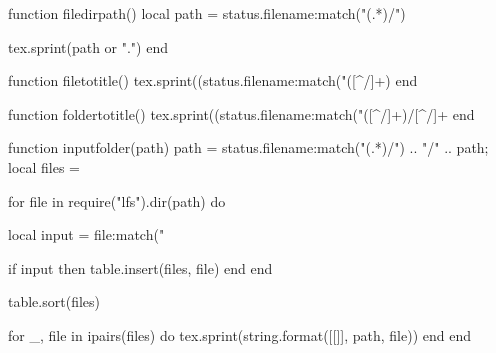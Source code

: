 \begin{luacode*}
    function filedirpath()
        local path = status.filename:match("(.*)/")

        tex.sprint(path or ".")
    end
\end{luacode*}

\begin{luacode*}
    function filetotitle()
        tex.sprint((status.filename:match("([^/]+)%
    end
\end{luacode*}

\begin{luacode*}
    function foldertotitle()
        tex.sprint((status.filename:match("([^/]+)/[^/]+%
    end
\end{luacode*}

\begin{luacode*}
    function inputfolder(path)
        path = status.filename:match("(.*)/") .. "/" .. path; local files = {}

        for file in require("lfs").dir(path) do

            local input = file:match("%

            if input then
                table.insert(files, file)
            end
        end

        table.sort(files)

        for _, file in ipairs(files) do
            tex.sprint(string.format([[]], path, file))
        end
    end
\end{luacode*}

\newcommand{\filedirpath}{\directlua{filedirpath()}}
\newcommand{\filetotitle}{\directlua{filetotitle()}}
\newcommand{\foldertotitle}{\directlua{foldertotitle()}}
\newcommand{\inputfolder}[1]{\directlua{inputfolder("#1")}}

